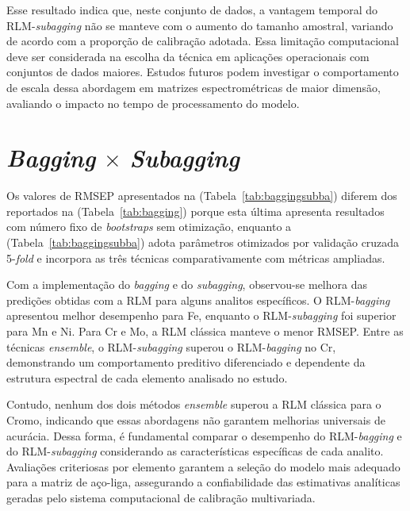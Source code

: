 Esse resultado indica que, neste conjunto de dados, a vantagem temporal do RLM-\textit{subagging} não se manteve com o aumento do tamanho amostral, variando de acordo com a proporção de calibração adotada. Essa limitação computacional deve ser considerada na escolha da técnica em aplicações operacionais com conjuntos de dados maiores. Estudos futuros podem investigar o comportamento de escala dessa abordagem em matrizes espectrométricas de maior dimensão, avaliando o impacto no tempo de processamento do modelo.

\section{\textit{Bagging} $\times$ \textit{Subagging}}
\label{bagxsuagg_result}

Os valores de RMSEP apresentados na (Tabela~\ref{tab:baggingsubba}) diferem dos reportados na (Tabela~\ref{tab:bagging}) porque esta última apresenta resultados com número fixo de \textit{bootstraps} sem otimização, enquanto a (Tabela~\ref{tab:baggingsubba}) adota parâmetros otimizados por validação cruzada 5-\textit{fold} e incorpora as três técnicas comparativamente com métricas ampliadas.

Com a implementação do \textit{bagging} e do \textit{subagging}, observou-se melhora das predições obtidas com a RLM para alguns analitos específicos. O RLM-\textit{bagging} apresentou melhor desempenho para Fe, enquanto o RLM-\textit{subagging} foi superior para Mn e Ni. Para Cr e Mo, a RLM clássica manteve o menor RMSEP. Entre as técnicas \textit{ensemble}, o RLM-\textit{subagging} superou o RLM-\textit{bagging} no Cr, demonstrando um comportamento preditivo diferenciado e dependente da estrutura espectral de cada elemento analisado no estudo.

Contudo, nenhum dos dois métodos \textit{ensemble} superou a RLM clássica para o Cromo, indicando que essas abordagens não garantem melhorias universais de acurácia. Dessa forma, é fundamental comparar o desempenho do RLM-\textit{bagging} e do RLM-\textit{subagging} considerando as características específicas de cada analito. Avaliações criteriosas por elemento garantem a seleção do modelo mais adequado para a matriz de aço-liga, assegurando a confiabilidade das estimativas analíticas geradas pelo sistema computacional de calibração multivariada.


